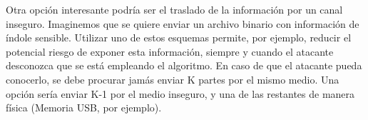 \documentclass[11pt]{scrartcl} %
\begin{document}
Otra opción interesante podría ser el traslado de la información por un canal inseguro. Imaginemos que se quiere enviar un archivo binario con información de índole sensible. Utilizar uno de estos esquemas permite, por ejemplo, reducir el potencial riesgo de exponer esta información, siempre y cuando el atacante desconozca que se está empleando el algoritmo. En caso de que el atacante pueda conocerlo, se debe procurar jamás enviar K partes por el mismo medio. Una opción sería enviar K-1 por el medio inseguro, y una de las restantes de manera física (Memoria USB, por ejemplo).

\end{document}
